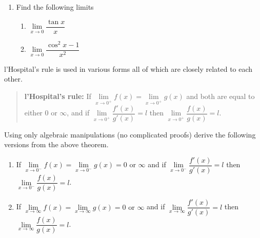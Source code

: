 \documentclass[9pt, a4paper, oneside]{amsart}
\begin{document}
\begin{questions}[resume]
\begin{enumerate}
		\item Find the following limits
		      \begin{multicols}{2}
		      	\begin{enumerate}
		      		\item $\lim \limits_{x \rightarrow 0} \dfrac{\tan x}{x}$
		      		\item $\lim \limits_{x \rightarrow 0} \dfrac{\cos^2 x - 1}{x^2}$
		      	\end{enumerate}
		      \end{multicols}
	\end{enumerate}

	\item l'Hospital's rule is used in various forms all of which are closely related to each other.

	\begin{quote}
		\textbf{l'Hospital's rule:} If $ \lim \limits_{x \rightarrow 0^+} f(x) = \lim \limits_{x \rightarrow 0^+} g(x)$ and both are equal to either 0 or $ \infty$, and if $\lim \limits_{x \rightarrow 0^+} \dfrac{f'(x)}{g'(x)} = l$ then $\lim \limits_{x \rightarrow 0^+} \dfrac{f(x)}{g(x)} = l$.
	\end{quote}

	Using only algebraic manipulations (no complicated proofs) derive the following versions from the above theorem.
	\begin{enumerate}
		\item If $ \lim \limits_{x \rightarrow 0^-} f(x) = \lim \limits_{x \rightarrow 0^-} g(x) = 0 \mbox{ or } \infty$ and if $\lim \limits_{x \rightarrow 0^-} \dfrac{f'(x)}{g'(x)} = l$ then $\lim \limits_{x \rightarrow 0^-} \dfrac{f(x)}{g(x)} = l$.
		\item If $ \lim \limits_{x \rightarrow \infty} f(x) = \lim \limits_{x \rightarrow \infty} g(x) = 0 \mbox{ or } \infty$ and if $\lim \limits_{x \rightarrow \infty} \dfrac{f'(x)}{g'(x)} = l$ then $\lim \limits_{x \rightarrow \infty} \dfrac{f(x)}{g(x)} = l$.
	\end{enumerate}


\end{questions}
\end{document}
